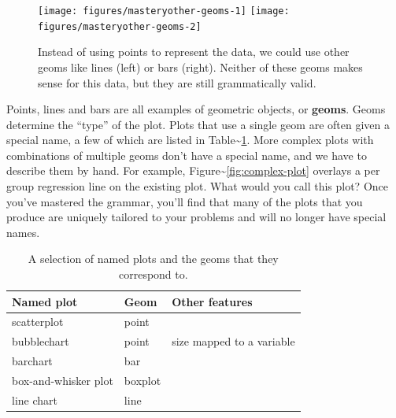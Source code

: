 \begin{figure}
\texttt{[image: figures/masteryother-geoms-1]} \texttt{[image: figures/masteryother-geoms-2]} \caption{Instead of using points to represent the data, we could use other geoms like lines (left) or bars (right).  Neither of these geoms makes sense for this data, but they are still grammatically valid.\label{fig:other-geoms}}
\end{figure}

Points, lines and bars are all examples of geometric objects, or
\textbf{geoms}. Geoms determine the ``type'' of the plot. Plots that use
a single geom are often given a special name, a few of which are listed
in Table\textasciitilde{}\ref{tbl:named-plots}. More complex plots with
combinations of multiple geoms don't have a special name, and we have to
describe them by hand. For example,
Figure\textasciitilde{}\ref{fig:complex-plot} overlays a per group
regression line on the existing plot. What would you call this plot?
Once you've mastered the grammar, you'll find that many of the plots
that you produce are uniquely tailored to your problems and will no
longer have special names. 

\begin{table}[ht]
\centering
\begin{tabular}{lll}
  \hline
Named plot & Geom & Other features \\ 
  \hline
scatterplot & point &  \\ 
  bubblechart & point & size mapped to a variable \\ 
  barchart & bar &  \\ 
  box-and-whisker plot & boxplot &  \\ 
  line chart & line &  \\ 
   \hline
\end{tabular}
\caption{A selection of named plots and the geoms that they correspond to.} 
\label{tbl:named-plots}
\end{table}

\begin{Shaded}
\begin{Highlighting}[]
  \StringTok{ }
\StringTok{  }\NormalTok{(} \StringTok{ }\NormalTok{), } \NormalTok{)}
\end{Highlighting}
\end{Shaded}

